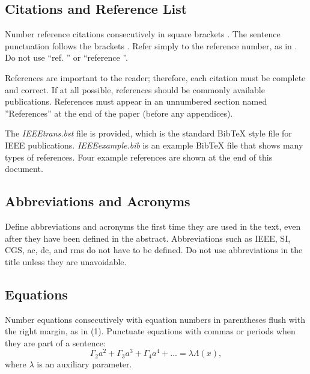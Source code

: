 \documentclass[letterpaper, 10 pt, conference]{ieeeconf}  %
\begin{document}
\subsection{Citations and Reference List}

Number reference citations consecutively in square brackets \cite{IEEEexample:article_typical}.
 The sentence punctuation follows the brackets \cite{IEEEexample:articleetal}.
 Refer simply to the reference number, as in \cite{IEEEexample:conf_typical}.
 Do not use ``ref. \cite{IEEEexample:conf_typical}'' or ``reference \cite{IEEEexample:conf_typical}''.

References are important to the reader; therefore, each citation must be complete and correct. 
If at all possible, references should be commonly available publications.  References must appear in an 
unnumbered section named ''References'' at the end of the paper (before any appendices).

The {\em IEEEtrans.bst} file is provided, which is the standard BibTeX
style file for IEEE publications.  {\em IEEEexample.bib} is an example
BibTeX file that shows many types of references.  Four example references
\cite{IEEEexample:article_typical,IEEEexample:articleetal,%
IEEEexample:conf_typical,IEEEexample:book_typical} are shown at
the end of this document.


\subsection{Abbreviations and Acronyms}

Define abbreviations and acronyms the first time they are used in the text,
even after they have been defined in the abstract. Abbreviations such as
IEEE, SI, CGS, ac, dc, and rms do not have to be defined. Do not use
abbreviations in the title unless they are unavoidable.

\subsection{Equations}

Number equations consecutively with equation numbers in parentheses flush
 with the right margin, as in (1). 
Punctuate equations with commas or periods when they are part of a sentence:
\begin{equation}
\Gamma_2 a^2 + \Gamma_3 a^3 + \Gamma_4 a^4 + ... = \lambda \Lambda(x),
\end{equation}
where $\lambda$ is an auxiliary parameter.
\end{document}
